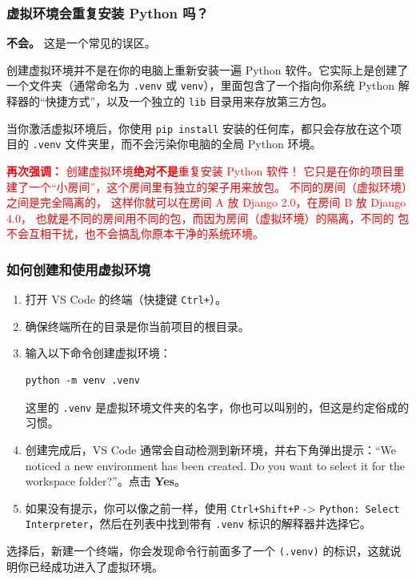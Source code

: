 \subsubsection{虚拟环境会重复安装 Python 吗？}
\textbf{不会。} 这是一个常见的误区。

创建虚拟环境并不是在你的电脑上重新安装一遍 Python 软件。它实际上是创建了一个文件夹（通常命名为 \texttt{.venv} 或 \texttt{venv}），里面包含了一个指向你系统 Python 解释器的“快捷方式”，以及一个独立的 \texttt{lib} 目录用来存放第三方包。

当你激活虚拟环境后，你使用 \texttt{pip install} 安装的任何库，都只会存放在这个项目的 \texttt{.venv} 文件夹里，而不会污染你电脑的全局 Python 环境。

\textcolor{red}{
    \textbf{再次强调：}
    创建虚拟环境\textbf{绝对不是}重复安装 Python 软件！
    它只是在你的项目里建了一个“小房间”，这个房间里有独立的架子用来放包。
    不同的房间（虚拟环境）之间是完全隔离的，
    这样你就可以在房间 A 放 Django 2.0，在房间 B 放 Django 4.0，
    也就是不同的房间用不同的包，而因为房间（虚拟环境）的隔离，不同的
    包不会互相干扰，也不会搞乱你原本干净的系统环境。
}





\subsubsection{如何创建和使用虚拟环境}
\begin{enumerate}
    \item 打开 VS Code 的终端（快捷键 \texttt{Ctrl+\textasciigrave}）。
    \item 确保终端所在的目录是你当前项目的根目录。
    \item 输入以下命令创建虚拟环境：
\begin{verbatim}
python -m venv .venv
\end{verbatim}
    这里的 \texttt{.venv} 是虚拟环境文件夹的名字，你也可以叫别的，但这是约定俗成的习惯。
    \item 创建完成后，VS Code 通常会自动检测到新环境，并右下角弹出提示：“We noticed a new environment has been created. Do you want to select it for the workspace folder?”。点击 \textbf{Yes}。
    \item 如果没有提示，你可以像之前一样，使用 \texttt{Ctrl+Shift+P} -> \texttt{Python: Select Interpreter}，然后在列表中找到带有 \texttt{.venv} 标识的解释器并选择它。
\end{enumerate}

选择后，新建一个终端，你会发现命令行前面多了一个 \texttt{(.venv)} 的标识，这就说明你已经成功进入了虚拟环境。
\newpage
